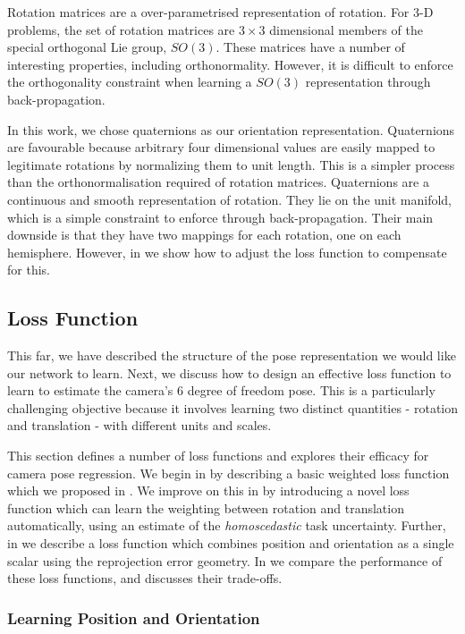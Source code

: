 Rotation matrices are a over-parametrised representation of rotation. For 3-D problems, the set of rotation matrices are $3\times3$ dimensional members of the special orthogonal Lie group, $SO(3)$. These matrices have a number of interesting properties, including orthonormality. However, it is difficult to enforce the orthogonality constraint when learning a $SO(3)$ representation through back-propagation.

In this work, we chose quaternions as our orientation representation. Quaternions are favourable because arbitrary four dimensional values are easily mapped to legitimate rotations by normalizing them to unit length. This is a simpler process than the orthonormalisation required of rotation matrices. Quaternions are a continuous and smooth representation of rotation. They lie on the unit manifold, which is a simple constraint to enforce through back-propagation. Their main downside is that they have two mappings for each rotation, one on each hemisphere. However, in  we show how to adjust the loss function to compensate for this.

\subsection{Loss Function}
\label{sec:loss}

This far, we have described the structure of the pose representation we would like our network to learn. Next, we discuss how to design an effective loss function to learn to estimate the camera's 6 degree of freedom pose. This is a particularly challenging objective because it involves learning two distinct quantities - rotation and translation - with different units and scales.

This section defines a number of loss functions and explores their efficacy for camera pose regression. We begin in  by describing a basic weighted loss function which we proposed in \citep{kendall2015posenet}. We improve on this in  by introducing a novel loss function which can learn the weighting between rotation and translation automatically, using an estimate of the \textit{homoscedastic} task uncertainty. Further, in  we describe a loss function which combines position and orientation as a single scalar using the reprojection error geometry. In  we compare the performance of these loss functions, and discusses their trade-offs.

\subsubsection{Learning Position and Orientation}
\label{sec:quat}

